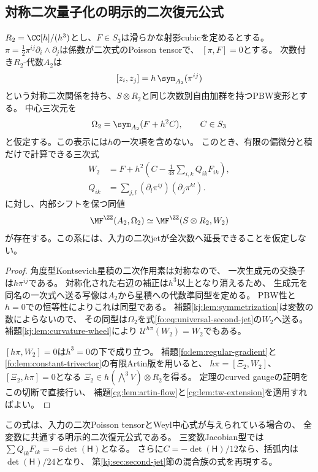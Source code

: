 \subsection{対称二次量子化の明示的二次復元公式}

\begin{corollary}[一般の対称二次関係からの二次式]
\label{fo:cor:universal-second-jet}
$R_2=\CC[h]/(h^3)$とし、$F\in S_3$は滑らかな射影cubicを定めるとする。
$\pi=\frac12\pi^{ij}\partial_i\wedge\partial_j$は係数が二次式のPoisson tensorで、
$[\pi,F]=0$とする。
次数付き$R_2$-代数$A_2$は
\[
 [z_i,z_j]=h\,\sym_{A_2}(\pi^{ij})
\]
という対称二次関係を持ち、$S\otimes R_2$と同じ次数別自由加群を持つPBW変形とする。
中心三次元を
\[
 \Omega_2=\sym_{A_2}(F+h^2C),\qquad C\in S_3
\]
と仮定する。この表示には$h$の一次項を含めない。
このとき、有限の偏微分と積だけで計算できる三次式
\begin{equation}\label{fo:eq:universal-second-jet}
 \boxed{\begin{aligned}
 W_2&=F+h^2\left(C-\frac1{48}\sum_{i,k}Q_{ik}F_{ik}\right),\\
 Q_{ik}&=\sum_{j,l}(\partial_l\pi^{ij})(\partial_j\pi^{kl}).
 \end{aligned}}
\end{equation}
に対し、内部シフトを保つ同値
\[
 \MF^{\ZZ}(A_2,\Omega_2)\simeq
 \MF^{\ZZ}(S\otimes R_2,W_2)
\]
が存在する。この系には、入力の二次jetが全次数へ延長できることを仮定しない。
\end{corollary}
\begin{proof}
角度型Kontsevich星積の二次作用素は対称なので、
一次生成元の交換子は$h\pi^{ij}$である。
対称化された右辺の補正は$h^3$以上となり消えるため、
生成元を同名の一次式へ送る写像は$A_2$から星積への代数準同型を定める。
PBW性と$h=0$での恒等性によりこれは同型である。
補題\ref{kj:lem:symmetrization}は変数の数によらないので、
その同型は$\Omega_2$を式\eqref{fo:eq:universal-second-jet}の$W_2$へ送る。
補題\ref{kj:lem:curvature-wheel}により
$\mathcal U^{h\pi}(W_2)=W_2$でもある。

$[h\pi,W_2]=0$は$h^3=0$の下で成り立つ。
補題\ref{fo:lem:regular-gradient}と
\ref{fo:lem:constant-trivector}の有限Artin版を用いると、
$h\pi=[\Xi_2,W_2]$、$[\Xi_2,h\pi]=0$となる
$\Xi_2\in h(\bigwedge^3 V)\otimes R_2$を得る。
定理のcurved gaugeの証明をこの切断で直接行い、
補題\ref{cg:lem:artin-flow}と\ref{cg:lem:tw-extension}を適用すればよい。
\end{proof}

この式は、入力の二次Poisson tensorとWeyl中心式が与えられている場合の、
全変数に共通する明示的二次復元公式である。
三変数Jacobian型では
$\sum Q_{ik}F_{ik}=-6\det(\mathsf H)$となる。
さらに$C=-\det(\mathsf H)/12$なら、括弧内は$\det(\mathsf H)/24$となり、
第\ref{kj:sec:second-jet}節の混合族の式を再現する。

